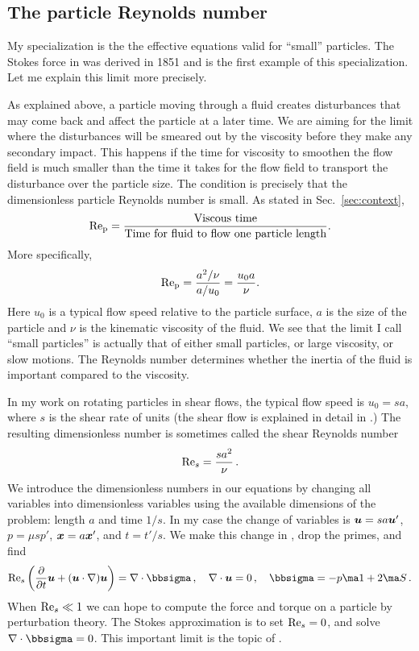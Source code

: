\documentclass[thesis.tex]{subfiles}
\begin{document}
\subsection{The particle Reynolds number}

My specialization is the the effective equations valid for ``small'' particles. The Stokes force in  was derived in 1851 \cite{stokes1851} and is the first example of this specialization. Let me explain this limit more precisely.

As explained above, a particle moving through a fluid creates disturbances that may come back and affect the particle at a later time. We are aiming for the limit where the disturbances will be smeared out by the viscosity before they make any secondary impact. This happens if the time for viscosity to smoothen the flow field is much smaller than the time it takes for the flow field to transport the disturbance over the particle size. The condition is precisely that the dimensionless particle Reynolds number is small. As stated in Sec.~\ref{sec:context},
\begin{align}
 	\mbox{Re}_{\mathrm p} = \frac{\textrm{Viscous time}}{\textrm{Time for fluid to flow one particle length}}.
\end{align}
More specifically,
\begin{align}
	\mbox{Re}_{\mathrm p} = \frac{a^2/\nu}{a/u_0} = \frac{u_0 a}{\nu}.
\end{align}
Here $u_0$ is a typical flow speed relative to the particle surface, $a$ is the size of the particle and $\nu$ is the kinematic viscosity of the fluid. We see that the limit I call ``small particles'' is actually that of either small particles, or large viscosity, or slow motions. The Reynolds number determines whether the inertia of the fluid is important compared to the viscosity.

In my work on rotating particles in shear flows, the typical flow speed is $u_0 = sa$, where $s$ is the shear rate of units  (the shear flow is explained in detail in .) The resulting dimensionless number is sometimes called the shear Reynolds number
\begin{align}
	\textrm{Re}_s = \frac{sa^2}{\nu}\,.
\end{align}
We introduce the dimensionless numbers in our equations by changing all variables into dimensionless variables using the available dimensions of the problem: length $a$ and time $1/s$. In my case the change of variables is $\mbox{\boldmath$u$} = sa \mbox{\boldmath$u$}'$, $p=\mu s p'$, $\mbox{\boldmath$x$}= a\mbox{\boldmath$x$}'$, and $t=t'/s$. We make this change in , drop the primes, and find
\begin{align}
\Reys \left(\pdiff{}{t}\ve u + (\ve u \cdot \nabla) \ve u\right)=\nabla \cdot \bbsigma\,,\quad \nabla \cdot \ve u = 0\,,\quad \bbsigma = -p \ma 1 + 2\ma S\,.\eqnlab{nsintrodimless}
\end{align}
When $\textrm{Re}_s\ll 1$ we can hope to compute the force and torque on a particle by perturbation theory. The Stokes approximation is to set $\textrm{Re}_s=0$, and solve $\nabla \cdot \bbsigma=0$. This important limit is the topic of .
\end{document}
